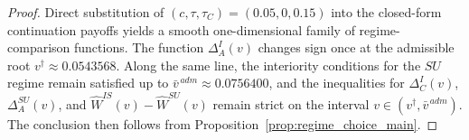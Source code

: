 \begin{proof}
Direct substitution of $(c,\tau,\tau_C)=(0.05,0,0.15)$ into the closed-form
continuation payoffs yields a smooth one-dimensional family of
regime-comparison functions. The function $\Delta_A^I(v)$ changes sign once at
the admissible root $v^\dagger \approx 0.0543568$. Along the same line, the
interiority conditions for the $SU$ regime remain satisfied up to
$\bar v^{\,adm}\approx 0.0756400$, and the inequalities for
$\Delta_C^I(v)$, $\Delta_A^{SU}(v)$, and
$\widehat W^{IS}(v)-\widehat W^{SU}(v)$ remain strict on the interval
$v\in(v^\dagger,\bar v^{\,adm})$. The conclusion then follows from
Proposition~\ref{prop:regime_choice_main}.
\end{proof}
